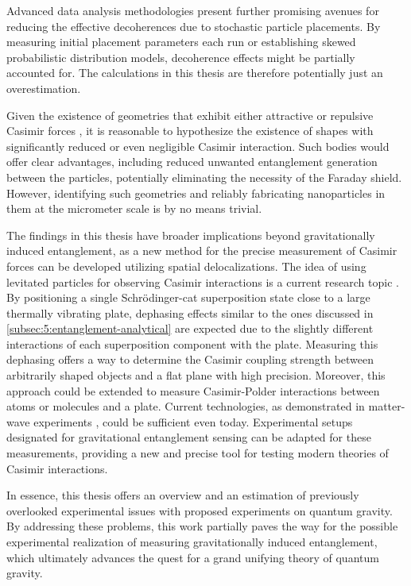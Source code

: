 Advanced data analysis methodologies present further promising avenues for reducing the effective decoherences due to stochastic particle placements.
By measuring initial placement parameters each run or establishing skewed probabilistic distribution models, decoherence effects might be partially accounted for. The calculations in this thesis are therefore potentially just an overestimation. 

Given the existence of geometries that exhibit either attractive or repulsive Casimir forces \cite{Boyer_1968}, it is reasonable to hypothesize the existence of shapes with significantly reduced or even negligible Casimir interaction.
Such bodies would offer clear advantages, including reduced unwanted entanglement generation between the particles, potentially eliminating the necessity of the Faraday shield.
However, identifying such geometries and reliably fabricating nanoparticles in them at the micrometer scale is by no means trivial.

The findings in this thesis have broader implications beyond gravitationally induced entanglement, as a new method for the precise measurement of Casimir forces can be developed utilizing spatial delocalizations.
The idea of using levitated particles for observing Casimir interactions is a current research topic \cite{Xu_2024}.
By positioning a single Schrödinger-cat superposition state close to a large thermally vibrating plate, dephasing effects similar to the ones discussed in \cref{subsec:5:entanglement-analytical} are expected due to the slightly different interactions of each superposition component with the plate.
Measuring this dephasing offers a way to determine the Casimir coupling strength between arbitrarily shaped objects and a flat plane with high precision.
Moreover, this approach could be extended to measure Casimir-Polder interactions between atoms or molecules and a plate.
Current technologies, as demonstrated in matter-wave experiments \cite{Fein_2019}, could be sufficient even today.
Experimental setups designated for gravitational entanglement sensing can be adapted for these measurements, providing a new and precise tool for testing modern theories of Casimir interactions.



In essence, this thesis offers an overview and an estimation of previously overlooked experimental issues with proposed experiments on quantum gravity.
By addressing these problems, this work partially paves the way for the possible experimental realization of measuring gravitationally induced entanglement, which ultimately advances the quest for a grand unifying theory of quantum gravity. 







